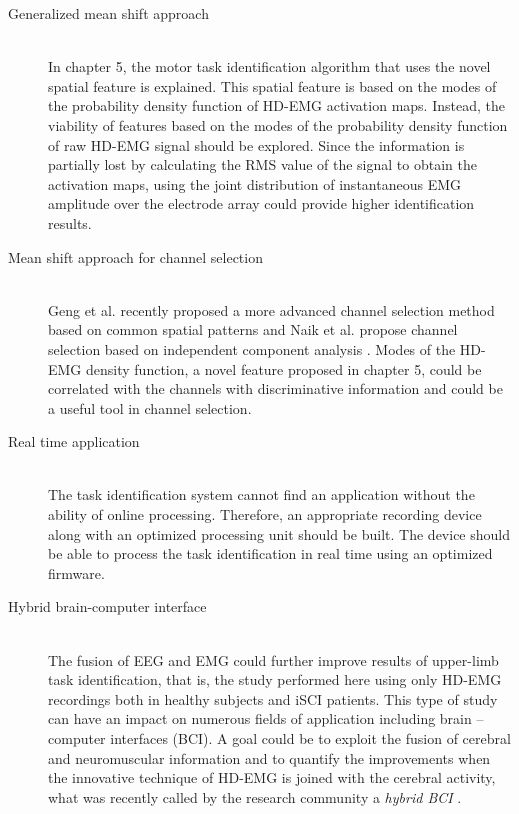\begin{description}

\item[Generalized mean shift approach] \hfill \\
	In chapter 5, the motor task identification algorithm that uses the novel spatial feature is explained. This spatial feature is based on the modes of the probability density function of HD-EMG activation maps. Instead, the viability of features based on the  modes of the probability density function of raw HD-EMG signal should be explored. Since the information is partially lost by calculating the RMS value of the signal to obtain the activation maps, using the joint distribution of instantaneous EMG amplitude over the electrode array could provide higher identification results.
	
\item[Mean shift approach for channel selection] \hfill \\
	Geng et al. recently proposed a more advanced channel selection method based on common spatial patterns \citep{Geng2014} and Naik et al. propose channel selection based on independent component analysis \citep{Naik2016}. Modes of the HD-EMG density function, a novel feature proposed in chapter 5, could be correlated with the channels with discriminative information and could be a useful tool in channel selection.

\item[Real time application] \hfill \\
	The task identification system cannot find an application without the ability of online processing. Therefore, an appropriate recording device along with an optimized processing unit should be built. The device should be able to process the task identification in real time using an optimized firmware.

\item[Hybrid brain-computer interface] \hfill \\
	The fusion of EEG and EMG could further improve results of upper-limb task identification, that is, the study performed here using only HD-EMG recordings both in healthy subjects and iSCI patients. This type of study can have an impact on numerous fields of application including brain – computer interfaces (BCI). A goal could be to exploit the fusion of cerebral and neuromuscular information and to quantify the improvements when the innovative technique of HD-EMG is joined with the cerebral activity, what was recently called by the research community a \emph{hybrid BCI} \citep{Muller-Putz2015, Rohm2013}.


\end{description}
